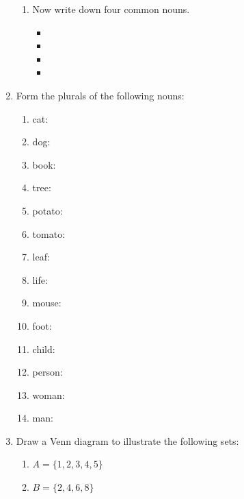 \documentclass{tufte-book}
\begin{document}
\begin{enumerate}
\begin{enumerate}
  \item Now write down four common nouns.
  \begin{multicols}{2}
  \begin{itemize}
    \item \dotfill\bigskip
    \item \dotfill\bigskip
    \item \dotfill\bigskip
    \item \dotfill\bigskip
  \end{itemize}
  \end{multicols}
  \end{enumerate}

  \item Form the plurals of the following nouns:
  \begin{multicols}{2}
  \begin{enumerate}
    \item cat: \dotfill\bigskip
    \item dog: \dotfill\bigskip
    \item book: \dotfill\bigskip
    \item tree: \dotfill\bigskip
    \item potato: \dotfill\bigskip
    \item tomato: \dotfill\bigskip
    \item leaf: \dotfill\bigskip
    \item life: \dotfill\bigskip
    \item mouse: \dotfill\bigskip
    \item foot: \dotfill\bigskip
    \item child: \dotfill\bigskip
    \item person: \dotfill\bigskip
    \item woman: \dotfill\bigskip
    \item man: \dotfill\bigskip
  \end{enumerate}
  \end{multicols}
  
  \item Draw a Venn diagram to illustrate the following sets:
  \begin{enumerate}
    \item $A = \{1, 2, 3, 4, 5\}$
    \item $B = \{2, 4, 6, 8\}$
  \end{enumerate}
\end{enumerate}
\end{document}

